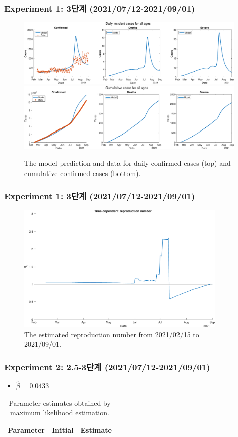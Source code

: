 \documentclass[aspectratio=169, 9pt, xcolor=dvipsnames]{beamer}
\begin{document}
	\begin{frame}\frametitle{Experiment 1: 3단계 (2021/07/12-2021/09/01)}
	    \begin{figure}
	    	\centering
	    	\includegraphics[width=11cm]{../results/estimate_sd_2nd_1/daily_all_age.eps}
	    	\includegraphics[width=11cm]{../results/estimate_sd_2nd_1/cumul_all_age.eps}
	    	\caption{The model prediction and data for daily confirmed cases (top) and cumulative confirmed cases (bottom).}
	    \end{figure}
	\end{frame}

	\begin{frame}\frametitle{Experiment 1: 3단계 (2021/07/12-2021/09/01)}
	    \begin{figure}
	    	\centering
	    	\includegraphics[width=10cm]{../results/estimate_sd_2nd_1/rep_num.eps}
	    	\caption{The estimated reproduction number from 2021/02/15 to 2021/09/01.}
	    \end{figure}
	\end{frame}

	\begin{frame}\frametitle{Experiment 2: 2.5-3단계 (2021/07/12-2021/09/01)}
	    \begin{itemize}
			\item $\hat{\beta} = 0.0433$
		\end{itemize}
	    \begin{table}
	    	\begin{tabular}{crr}
	    		\toprule
	    		\textbf{Parameter} & \textbf{Initial} & \textbf{Estimate} \\
	    		\midrule
	    		
	    		\bottomrule
	    	\end{tabular}
	    	\caption{Parameter estimates obtained by maximum likelihood estimation.}
	    \end{table}
	\end{frame}
\end{document}
